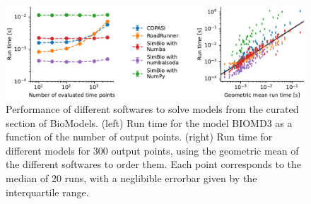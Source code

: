 \begin{figure}[t]

{\centering \includegraphics{src/performance/figures/performance}

}

\caption{
    \label{fig-runtime}
    Performance of different softwares to solve models from the curated section of BioModels.
    (left) Run time for the model BIOMD3 as a function of the number of output points.
    (right) Run time for different models for 300 output points,
    using the geometric mean of the different softwares to order them.
    Each point corresponds to the median of 20 runs,
    with a neglibible errorbar given by the interquartile range.
}

\end{figure}
